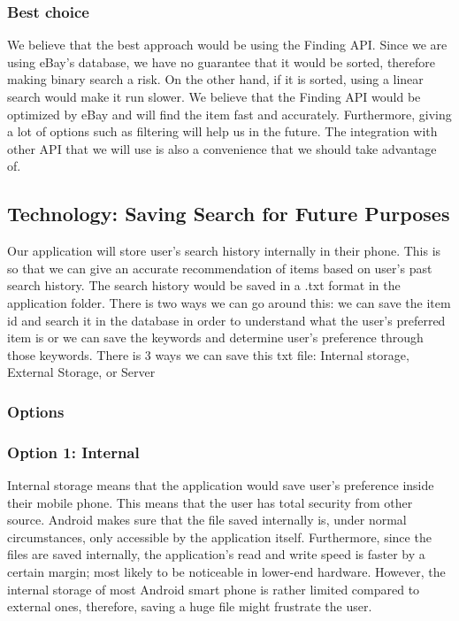 \documentclass[journal,compsoc, 10pt, draftclsnofoot, onecolumn]{IEEEtran}
\begin{document}
\subsubsection{Best choice}
We believe that the best approach would be using the Finding API. Since we are using
eBay's database, we have no guarantee that it would be sorted, therefore making
binary search a risk. On the other hand, if it is sorted, using a linear search would
make it run slower. We believe that the Finding API would be optimized by eBay and
will find the item fast and accurately. Furthermore, giving a lot of options such as
filtering will help us in the future. The integration with other API that we will use
is also a convenience that we should take advantage of.
  
\subsection{Technology: Saving Search for Future Purposes}
Our application will store user's search history internally in their phone. This is
so that we can give an accurate recommendation of items based on user's past search
history. The search history would be saved in a .txt format in the application
folder. There is two ways we can go around this: we can save the item id and search
it in the database in order to understand what the user's preferred item is or we can
save the keywords and determine user's preference through those keywords.
There is 3 ways we can save this txt file: Internal storage, External Storage, or
Server

\subsubsection{Options}
\subsubsection*{Option 1: Internal}
Internal storage means that the application would save user's preference inside their
mobile phone. This means that the user has total security from other source. Android
makes sure that the file saved internally is, under normal circumstances, only
accessible by the application itself. Furthermore, since the files are saved
internally, the application's read and write speed is faster by a certain margin;
most likely to be noticeable in lower-end hardware. However, the internal storage of
most Android smart phone is rather limited compared to external ones, therefore,
saving a huge file might frustrate the user.
\end{document}
